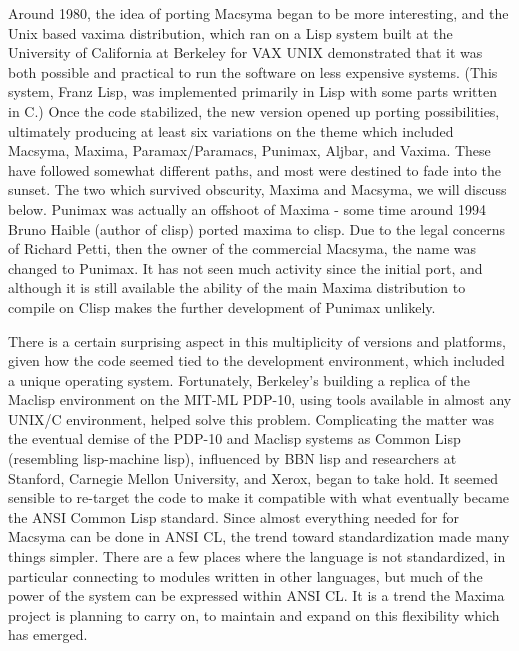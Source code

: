 Around 1980, the idea of porting Macsyma began to be more interesting,
and the Unix based vaxima distribution, which ran on a Lisp system 
built at the University of California at Berkeley for VAX UNIX demonstrated 
that it was both possible and practical to run the software on less expensive 
systems.  (This system, Franz Lisp, was implemented primarily in Lisp with 
some parts written in C.) Once the code stabilized, the new version opened up 
porting possibilities, ultimately producing at least six variations on the 
theme which included Macsyma, Maxima, Paramax/Paramacs, Punimax, Aljbar, and 
Vaxima.  These have followed somewhat different paths, and most were destined 
to fade into the sunset.  The two which survived obscurity, Maxima and 
Macsyma, we will discuss below.  Punimax was actually an offshoot of Maxima - 
some time around 1994 Bruno Haible (author of clisp) ported maxima to clisp.
Due to the legal concerns of Richard Petti, then the owner of the commercial
Macsyma, the name was changed to Punimax.  It has not seen much activity since
the initial port, and although it is still available the ability of the main
Maxima distribution to compile on Clisp makes the further development of 
Punimax unlikely.

 There is a certain surprising aspect in this multiplicity of versions
and platforms, given how the code seemed tied to the development environment,
which included a unique operating system.  Fortunately, Berkeley's building 
a replica of the Maclisp environment on the MIT-ML PDP-10, using tools 
available in almost any UNIX/C environment, helped solve this problem.
Complicating the matter was the eventual demise of the PDP-10 and 
Maclisp systems as Common Lisp (resembling lisp-machine lisp), influenced by 
BBN lisp and researchers at Stanford, Carnegie Mellon University, and Xerox, began to take 
hold.  It seemed sensible to re-target
the code to make it compatible with what eventually
became the ANSI Common Lisp standard.  Since almost everything needed for
for Macsyma can be done in ANSI CL, the trend toward standardization 
made many things simpler.  There are a few places
where the language is not standardized, in particular connecting to
modules written in other languages, but much of the power of the
system can be expressed within ANSI CL. It is a trend the Maxima
project is planning to carry on, to maintain and expand on this
flexibility which has emerged.

